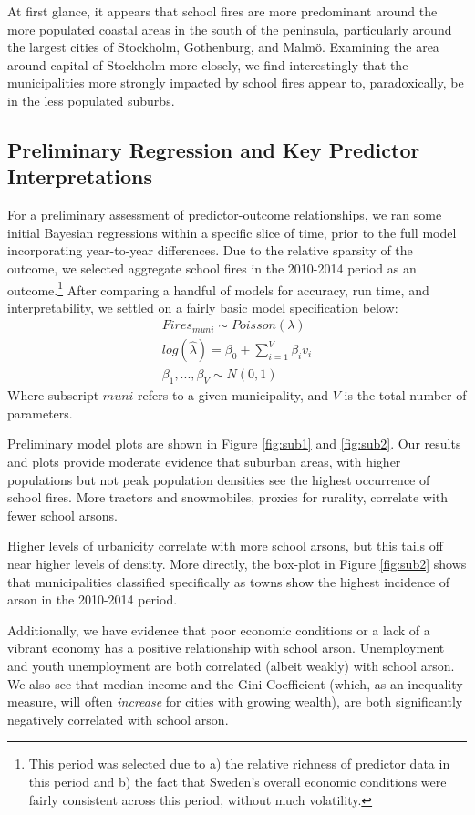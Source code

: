 \documentclass[10pt,a4paper, hidelinks]{article} %
\begin{document}
At first glance, it appears that school fires are more predominant around the more populated coastal areas in the south of the peninsula, particularly around the largest cities of Stockholm, Gothenburg, and Malm{\"o}. Examining the area around capital of Stockholm more closely, we find interestingly that the municipalities more strongly impacted by school fires appear to, paradoxically, be in the less populated suburbs.

\subsection{Preliminary Regression and Key Predictor Interpretations}

For a preliminary assessment of predictor-outcome relationships, we ran some initial Bayesian regressions within a specific slice of time, prior to the full model incorporating year-to-year differences. Due to the relative sparsity of the outcome, we selected aggregate school fires in the 2010-2014 period as an outcome.\footnote{This period was selected due to a) the relative richness of predictor data in this period and b) the fact that Sweden's overall economic conditions were fairly consistent across this period, without much volatility.} After comparing a handful of models for accuracy, run time, and interpretability, we settled on a fairly basic model specification below:
\begin{align*}
Fires_{muni} \sim Poisson(\lambda) \\
log(\hat{\lambda}) = \beta_0 + \sum\nolimits_{i=1}^V \beta_iv_i \\
\beta_1,...,\beta_V \sim N(0,1)
\end{align*}
Where subscript $muni$ refers to a given municipality, and $V$ is the total number of parameters.

Preliminary model plots are shown in Figure \ref{fig:sub1} and \ref{fig:sub2}. Our results and plots provide moderate evidence that suburban areas, with higher populations but not peak population densities see the highest occurrence of school fires. More tractors and snowmobiles, proxies for rurality, correlate with fewer school arsons. 

Higher levels of urbanicity correlate with more school arsons, but this tails off near higher levels of density. More directly, the box-plot in Figure \ref{fig:sub2} shows that municipalities classified specifically as towns show the highest incidence of arson in the 2010-2014 period.

Additionally, we have evidence that poor economic conditions or a lack of a vibrant economy has a positive relationship with school arson. Unemployment and youth unemployment are both correlated (albeit weakly) with school arson. We also see that median income and the Gini Coefficient (which, as an inequality measure, will often \textit{increase} for cities with growing wealth), are both significantly negatively correlated with school arson.
\end{document}
